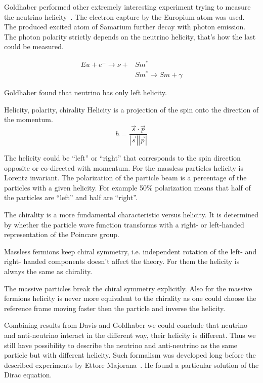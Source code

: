 \documentclass[../main.tex]{subfiles}
\begin{document}
Goldhaber performed other extremely interesting experiment trying to measure the neutrino helicity~\cite{Goldhaber1958}. The electron capture by the Europium atom was used. The produced excited atom of Samarium further decay with photon emission. The photon polarity strictly depends on the neutrino helicity, that's how the last could be measured.

\begin{align}
Eu+e^-\to\nu+&Sm^* \\ \nonumber
&Sm^*\to Sm+\gamma
\end{align}

Goldhaber found that neutrino has only left helicity.

\begin{bclogo}[couleur=blue!2, arrondi=0.1, logo=\bcinfo, nobreak=true]{Helicity, polarity, chirality}
Helicity is a projection of the spin onto the direction of the momentum.
\begin{equation}
h=\frac{\vec{s}\cdot\vec{p}}{\left|\vec{s}\right|\left|\vec{p}\right|}
\end{equation}

The helicity could be ``left'' or ``right'' that corresponds to the spin direction opposite or co-directed with momentum. For the massless particles helicity is Lorentz invariant. The polarization of the particle beam is a percentage of the particles with a given helicity. For example 50\% polarization means that half of the particles are ``left'' and half are ``right''.

The chirality is a more fundamental characteristic versus helicity. It is determined by whether the particle wave function transforms with a right- or left-handed representation of the Poincare group.

Massless fermions keep chiral symmetry, i.e. independent rotation of the left- and right- handed components doesn't affect the theory. For them the helicity is always the same as chirality.

The massive particles break the chiral symmetry explicitly. Also for the massive fermions helicity is never more equivalent to the chirality as one could choose the reference frame moving faster then the particle and inverse the helicity.
\end{bclogo}

Combining results from Davis and Goldhaber we could conclude that neutrino and anti-neutrino interact in the different way, their helicity is different. Thus we still have possibility to describe the neutrino and anti-neutrino as the same particle but with different helicity. Such formalism was developed long before the described experiments by Ettore Majorana~\cite{Majorana1937}. He found a particular solution of the Dirac equation.
\end{document}
